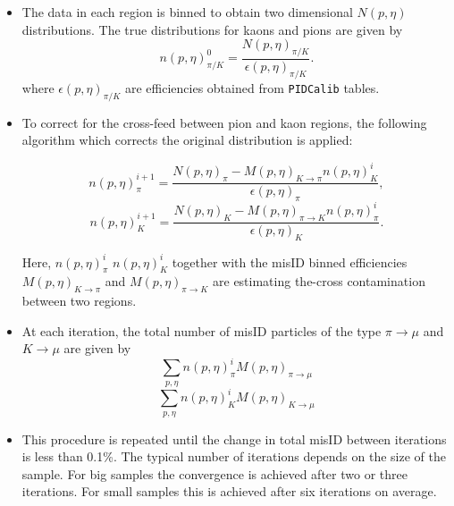 \begin {itemize}
 \begin{itemize} 

\item The data in each region is binned to obtain two dimensional $N(p, \eta)$ distributions\DIFdelbegin {}\DIFdelend . The true \DIFdelbegin {}\DIFdelend \DIFaddbegin {}\DIFaddend distributions for kaons and pions are given by
\begin{equation}
n(p, \eta )^{0}_{\pi/K} = \frac{N(p, \eta )_{\pi/K}}{\epsilon(p,\eta )_{\pi/K}}.
\end{equation}
where $\epsilon(p,\eta)_{\pi/K}$ are efficiencies obtained from \texttt{PIDCalib} tables.

\item To correct for the cross-feed between \DIFaddbegin {}\DIFaddend pion and kaon regions, the following algorithm which corrects the original distribution is applied:

\begin{equation}
n(p, \eta)^{i+1}_{\pi}=\frac{N(p, \eta)_{\pi}-M(p, \eta)_{K \rightarrow \pi} n(p, \eta)^{i}_{K}}{\epsilon(p,\eta)_{\pi}},
\end{equation}
\begin{equation}
n(p, \eta)^{i+1}_{K}=\frac{N(p, \eta)_{K}-M(p, \eta)_{\pi \rightarrow K} n(p, \eta)^{i}_{\pi}}{\epsilon(p,\eta)_{K}}.
\end{equation}

Here, $n(p, \eta)^{i}_{\pi}$  $n(p, \eta)^{i}_{K}$ together with the misID binned efficiencies $M(p, \eta )_{K \rightarrow \pi}$ and $M(p, \eta)_{\pi \rightarrow K}$ are estimating the-cross contamination between two regions. \DIFaddbegin {}\texttt{}\DIFaddend 


\item At each iteration, the total number of misID particles of the type $\pi \rightarrow \mu$ and $K \rightarrow \mu$ \DIFdelbegin {}\DIFdelend are given by
\begin{equation}
\sum_{p,\eta} n(p, \eta)^{i}_{\pi} M(p, \eta)_{\pi\rightarrow\mu} 
\end{equation}
\begin{equation}
\sum_{p,\eta} n(p, \eta)^{i}_{K} M(p, \eta)_{K\rightarrow\mu}
\end{equation}
\item This procedure is repeated until the change in total misID between iterations is less than 0.1\%. The typical number of iterations depends on the size of the sample. For big samples the convergence is achieved after two or three iterations. For small samples this is achieved after six iterations on average.


\end{itemize}
\end{itemize}
